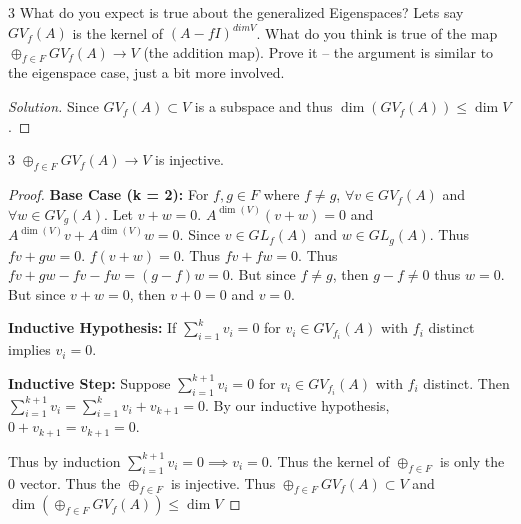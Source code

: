\documentclass{article}
\newenvironment{solution}
{\renewcommand\qedsymbol{$\blacksquare$}\begin{proof}[Solution]}
{\end{proof}}
\begin{document}
\bigskip

\begin{PROB}{3}\label{Problem 3.}
    What do you expect is true about the generalized Eigenspaces? Lets say $GV_f(A)$ is the kernel of $(A - fI)^{dim V}$. What do you think is true of the map  $\oplus_{f \in F} GV_f(A) \to V$ (the addition map). Prove it -- the argument is similar to the eigenspace case, just a bit more involved.
\end{PROB}
\begin{solution}
    Since $GV_f(A) \subset V$ is a subspace and thus $\dim(GV_f(A)) \leq \dim V$.
\end{solution}
\begin{claim}{3}
    $\oplus_{f \in F} GV_f(A) \to V$ is injective. 
\end{claim}
\begin{proof}
    \textbf{Base Case (k = 2): } For $f, g \in F$ where $f \neq g$, $\forall v \in GV_{f}(A)$ and $\forall w \in GV_{g}(A)$. Let $v + w = 0$. $A^{\dim(V)}(v + w) = 0$ and $A^{\dim(V)}v + A^{\dim(V)}w = 0$. Since $v \in GL_{f}(A)$ and $w \in GL_{g}(A)$. Thus $fv + gw = 0$. $f(v + w) = 0$. Thus $fv + fw = 0$. Thus $fv + gw - fv - fw = (g - f)w = 0$. But since $f \neq g$, then $g - f \neq 0$ thus $w = 0$. But since $v + w = 0$, then $v + 0 = 0$ and $v = 0$.

    \textbf{Inductive Hypothesis: } If $\sum_{i = 1}^k v_i = 0$ for $v_i \in GV_{f_i}(A)$ with $f_i$ distinct implies $v_i = 0$.

    \textbf{Inductive Step: } Suppose $\sum_{i = 1}^{k + 1} v_i = 0$ for $v_i \in GV_{f_i}(A)$ with $f_i$ distinct. Then $\sum_{i = 1}^{k + 1} v_i = \sum_{i = 1}^k v_i + v_{k+1} = 0$. By our inductive hypothesis, $0 + v_{k + 1} = v_{k + 1} = 0$. 

    Thus by induction $\sum_{i = 1}^{k + 1} v_i = 0 \implies v_i = 0$. Thus the kernel of $\oplus_{f \in F}$ is only the 0 vector. Thus the $\oplus_{f \in F}$ is injective. Thus $\oplus_{f \in F} GV_f(A) \subset V$ and $\dim(\oplus_{f \in F} GV_f(A)) \leq \dim V$
\end{proof}

\bigskip
\end{document}
